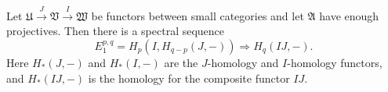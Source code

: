 Let $\mathfrak{U} \xrightarrow{J} \mathfrak{V} \xrightarrow{I} \mathfrak{W}$ be functors between small categories and let $\mathfrak{A}$ have enough projectives. Then there is a spectral sequence
$$
E_1^{p,q} = H_p(I, H_{q-p}(J, -)) \Rightarrow H_q(IJ, -).
$$
Here $H_*(J, -)$ and $H_*(I, -)$ are the $J$-homology and $I$-homology functors, and $H_*(IJ, -)$ is the homology for the composite functor $IJ$.
